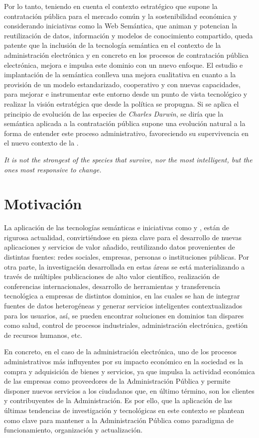 \documentclass[a4paper,twoside,12pt]{report}
\begin{document}
Por lo tanto, teniendo en cuenta el contexto estratégico que supone la contratación pública
para el mercado común y la sostenibilidad económica y considerando iniciativas
como la Web Semántica, que animan y potencian la reutilización de datos, información
y modelos de conocimiento compartido, queda patente que la inclusión de la tecnología
semántica en el contexto de la administración electrónica y en concreto en los
procesos de contratación pública electrónica, mejora e impulsa este dominio con un 
nuevo enfoque. El estudio e implantación de la semántica conlleva una mejora
cualitativa en cuanto a la provisión de un modelo estandarizado, cooperativo y con
nuevas capacidades, para mejorar e instrumentar este entorno desde un punto
de vista tecnológico y realizar la visión estratégica que desde la política
se propugna. Si se aplica el principio de evolución de las especies
de \textit{Charles Darwin}, se diría que la semántica aplicada a la contratación pública
supone una evolución natural a la forma de entender este proceso administrativo, favoreciendo
su supervivencia en el nuevo contexto de la \wode.

\textit{It is not the strongest of the species that survive, nor the most
intelligent, but the ones most responsive to change.}

\section{Motivación}
La aplicación de las tecnologías semánticas e iniciativas como \opendata y
\linkeddata, están de rigurosa actualidad, convirtiéndose en pieza clave
para el desarrollo de nuevas aplicaciones y servicios de valor añadido,
reutilizando datos provenientes de distintas fuentes: redes sociales, empresas,
personas o instituciones públicas. Por otra parte, la investigación desarrollada
en estas áreas se está materializando a través de múltiples publicaciones de
alto valor científico, realización de conferencias internacionales, desarrollo
de herramientas y transferencia tecnológica a empresas de distintos
dominios, en las cuales se han de integrar fuentes de datos heterogéneas y generar
servicios inteligentes contextualizados para los usuarios, así, se pueden 
encontrar soluciones en dominios tan dispares como salud, control de procesos
industriales, administración electrónica, gestión de recursos humanos, etc.

En concreto, en el caso de la administración electrónica, uno de los procesos
administrativos más influyentes por su impacto económico en la sociedad es la compra y adquisición
de bienes y servicios, ya que impulsa la actividad económica de las empresas como proveedores
de la Administración Pública y permite disponer nuevos servicios a los ciudadanos que, en último término, son los clientes
y contribuyentes de la Administración. Es por ello, que la aplicación de
las últimas tendencias de investigación y tecnológicas en este contexto se plantean
como clave para mantener a la Administración Pública como paradigma de funcionamiento,
organización y actualización.
\end{document}

